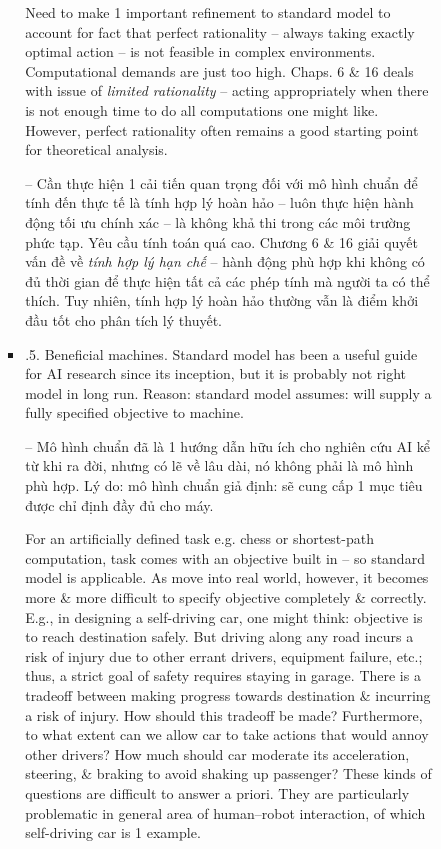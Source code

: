 \documentclass{article}
\begin{document}
\begin{itemize}
\begin{itemize}
\begin{itemize}
\begin{itemize}
				Need to make 1 important refinement to standard model to account for fact that perfect rationality -- always taking exactly optimal action -- is not feasible in complex environments. Computational demands are just too high. Chaps. 6 \& 16 deals with issue of {\it limited rationality} -- acting appropriately when there is not enough time to do all computations one might like. However, perfect rationality often remains a good starting point for theoretical analysis.
				
				-- Cần thực hiện 1 cải tiến quan trọng đối với mô hình chuẩn để tính đến thực tế là tính hợp lý hoàn hảo -- luôn thực hiện hành động tối ưu chính xác -- là không khả thi trong các môi trường phức tạp. Yêu cầu tính toán quá cao. Chương 6 \& 16 giải quyết vấn đề về {\it tính hợp lý hạn chế} -- hành động phù hợp khi không có đủ thời gian để thực hiện tất cả các phép tính mà người ta có thể thích. Tuy nhiên, tính hợp lý hoàn hảo thường vẫn là điểm khởi đầu tốt cho phân tích lý thuyết.				
				\item {.5. Beneficial machines.} Standard model has been a useful guide for AI research since its inception, but it is probably not right model in long run. Reason: standard model assumes: will supply a fully specified objective to machine.
				
				-- Mô hình chuẩn đã là 1 hướng dẫn hữu ích cho nghiên cứu AI kể từ khi ra đời, nhưng có lẽ về lâu dài, nó không phải là mô hình phù hợp. Lý do: mô hình chuẩn giả định: sẽ cung cấp 1 mục tiêu được chỉ định đầy đủ cho máy.
								
				For an artificially defined task e.g. chess or shortest-path computation, task comes with an objective built in -- so standard model is applicable. As move into real world, however, it becomes more \& more difficult to specify objective completely \& correctly. E.g., in designing a self-driving car, one might think: objective is to reach destination safely. But driving along any road incurs a risk of injury due to other errant drivers, equipment failure, etc.; thus, a strict goal of safety requires staying in garage. There is a tradeoff between making progress towards destination \& incurring a risk of injury. How should this tradeoff be made? Furthermore, to what extent can we allow car to take actions that would annoy other drivers? How much should car moderate its acceleration, steering, \& braking to avoid shaking up passenger? These kinds of questions are difficult to answer a priori. They are particularly problematic in general area of human--robot interaction, of which self-driving car is 1 example.
				

\end{itemize}
\end{itemize}
\end{itemize}
\end{itemize}
\end{document}

